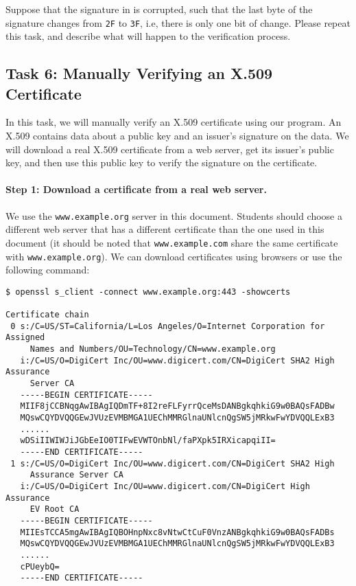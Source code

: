 Suppose that the signature in is corrupted, such that the 
last byte of the signature changes from \texttt{2F} to \texttt{3F}, i.e, there is only one bit
of change.  Please repeat this task, 
and describe what will happen to the verification process. 




\subsection{Task 6: Manually Verifying an X.509 Certificate}

In this task, we will manually verify an X.509 certificate using our program. 
An X.509 contains data about a public key and an issuer's signature on the data. 
We will download a real X.509 certificate from a web server, get its issuer's public key, and then
use this public key to verify the signature on the certificate. 


\paragraph{Step 1: Download a certificate from a real web server.} 
We use the \texttt{www.example.org} server in this document. Students 
should choose a different web server that has a different certificate than the one used in this
document (it should be noted that \texttt{www.example.com} share the same certificate with
\texttt{www.example.org}). 
We can download certificates using browsers or use the following command: 

\begin{lstlisting}
$ openssl s_client -connect www.example.org:443 -showcerts

Certificate chain
 0 s:/C=US/ST=California/L=Los Angeles/O=Internet Corporation for Assigned 
     Names and Numbers/OU=Technology/CN=www.example.org
   i:/C=US/O=DigiCert Inc/OU=www.digicert.com/CN=DigiCert SHA2 High Assurance 
     Server CA
   -----BEGIN CERTIFICATE-----
   MIIF8jCCBNqgAwIBAgIQDmTF+8I2reFLFyrrQceMsDANBgkqhkiG9w0BAQsFADBw
   MQswCQYDVQQGEwJVUzEVMBMGA1UEChMMRGlnaUNlcnQgSW5jMRkwFwYDVQQLExB3
   ......
   wDSiIIWIWJiJGbEeIO0TIFwEVWTOnbNl/faPXpk5IRXicapqiII=
   -----END CERTIFICATE-----
 1 s:/C=US/O=DigiCert Inc/OU=www.digicert.com/CN=DigiCert SHA2 High 
     Assurance Server CA
   i:/C=US/O=DigiCert Inc/OU=www.digicert.com/CN=DigiCert High Assurance 
     EV Root CA
   -----BEGIN CERTIFICATE-----
   MIIEsTCCA5mgAwIBAgIQBOHnpNxc8vNtwCtCuF0VnzANBgkqhkiG9w0BAQsFADBs
   MQswCQYDVQQGEwJVUzEVMBMGA1UEChMMRGlnaUNlcnQgSW5jMRkwFwYDVQQLExB3
   ...... 
   cPUeybQ=
   -----END CERTIFICATE-----
\end{lstlisting}

